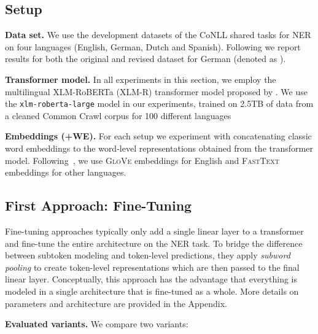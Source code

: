 \documentclass[11pt,a4paper]{article}
\begin{document}
\subsection{Setup}

\noindent
\textbf{Data set.} We use the development datasets of the CoNLL shared tasks \citep{tjong-kim-sang-de-meulder-2003-introduction,tjong-kim-sang-2002-introduction} for NER on four languages (English, German, Dutch and Spanish). Following \citet{yu-etal-2020-named} we report results for both the original and revised dataset for German (denoted as ).

\noindent
\textbf{Transformer model.}
In all experiments in this section, we employ the multilingual XLM-RoBERTa (XLM-R) transformer model proposed by \citet{conneau2019unsupervised}. We use the \texttt{xlm-roberta-large} model in our experiments, trained on 2.5TB of data from a cleaned Common Crawl corpus \cite{wenzek-etal-2020-ccnet} for 100 different languages



\noindent
\textbf{Embeddings (+WE).}
For each setup we experiment with concatenating classic word embeddings to the word-level representations obtained from the transformer model. Following~\citet{akbik-etal-2018-contextual}, we use \textsc{GloVe} embeddings \citep{pennington-etal-2014-glove} for English and \textsc{FastText} embeddings \citep{bojanowski-etal-2017-enriching} for other languages.






\subsection{First Approach: Fine-Tuning}
\label{sec:fine_tuning}
\vspace{-1mm}

Fine-tuning approaches typically only add a single linear layer to a transformer and fine-tune the entire architecture on the NER task. To bridge the difference between subtoken modeling and token-level predictions, they apply \textit{subword pooling} to create token-level representations which are then passed to the final linear layer. Conceptually, this approach has the advantage that everything is modeled in a single architecture that is fine-tuned as a whole. More details on parameters and architecture are provided in the Appendix. 



\noindent 
\textbf{Evaluated variants.} 
We compare two variants: 
\end{document}
